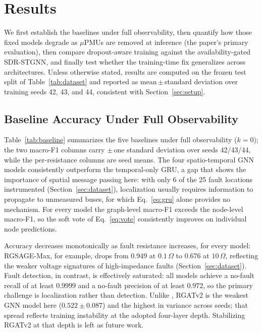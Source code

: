 \documentclass[3p,times,procedia]{elsarticle}
\begin{document}
\section{Results}
\label{sec:results}

We first establish the baselines under full observability, then quantify how those fixed models degrade as $\mu$PMUs are removed at inference (the paper's primary evaluation), then compare dropout-aware training against the availability-gated SDR-STGNN, and finally test whether the training-time fix generalizes across architectures. Unless otherwise stated, results are computed on the frozen test split of Table~\ref{tab:dataset} and reported as mean\,$\pm$\,standard deviation over training seeds 42, 43, and 44, consistent with Section~\ref{sec:setup}.

\subsection{Baseline Accuracy Under Full Observability}
\label{sec:res-baseline}

Table~\ref{tab:baseline} summarizes the five baselines under full observability ($k=0$); the two macro-F1 columns carry $\pm$\,one standard deviation over seeds 42/43/44, while the per-resistance columns are seed means. The four spatio-temporal GNN models consistently outperform the temporal-only GRU, a gap that shows the importance of spatial message passing here: with only 6 of the 25 fault locations instrumented (Section~\ref{sec:dataset}), localization usually requires information to propagate to unmeasured buses, for which Eq.~\eqref{eq:gru} alone provides no mechanism. For every model the graph-level macro-F1 exceeds the node-level macro-F1, so the soft vote of Eq.~\eqref{eq:vote} consistently improves on individual node predictions.

Accuracy decreases monotonically as fault resistance increases, for every model: RGSAGE-Max, for example, drops from 0.949 at $0.1\,\Omega$ to 0.676 at $10\,\Omega$, reflecting the weaker voltage signatures of high-impedance faults (Section~\ref{sec:dataset}). Fault detection, in contrast, is effectively saturated: all models achieve a no-fault recall of at least $0.9999$ and a no-fault precision of at least $0.972$, so the primary challenge is localization rather than detection. Unlike \cite{Karabulut2026}, RGATv2 is the weakest GNN model here ($0.522\pm0.087$) and the highest in variance across seeds; that spread reflects training instability at the adopted four-layer depth. Stabilizing RGATv2 at that depth is left as future work.
\end{document}
